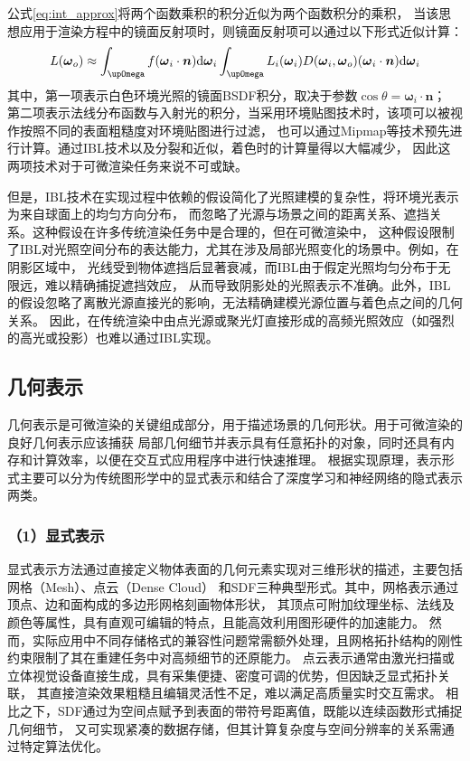 公式\eqref{eq:int_approx}将两个函数乘积的积分近似为两个函数积分的乘积，
当该思想应用于渲染方程中的镜面反射项时，则镜面反射项可以通过以下形式近似计算：
\begin{equation}
  L({\boldsymbol{\omega}}_o)\approx 
  \int_{\upOmega}{f({\boldsymbol{\omega}}_i\cdot{\boldsymbol{n}}){\rm{d}}{\boldsymbol{\omega}}_i}
  \int_{\upOmega}{L_i({\boldsymbol{\omega}}_i)D({\boldsymbol{\omega}}_i,{\boldsymbol{\omega}}_o)({\boldsymbol{\omega}}_i\cdot{\boldsymbol{n}}){\rm{d}}{\boldsymbol{\omega}}_i}
  \label{eq:L_omega_o_approx}
\end{equation}
其中，第一项表示白色环境光照的镜面BSDF积分，取决于参数$\cos{\theta}={\boldsymbol{\omega}}_i\cdot{\boldsymbol{n}}；$
第二项表示法线分布函数与入射光的积分，当采用环境贴图技术时，该项可以被视作按照不同的表面粗糙度对环境贴图进行过滤，
也可以通过Mipmap等技术预先进行计算。通过IBL技术以及分裂和近似，着色时的计算量得以大幅减少，
因此这两项技术对于可微渲染任务来说不可或缺。

但是，IBL技术在实现过程中依赖的假设简化了光照建模的复杂性，将环境光表示为来自球面上的均匀方向分布，
而忽略了光源与场景之间的距离关系、遮挡关系。这种假设在许多传统渲染任务中是合理的，但在可微渲染中，
这种假设限制了IBL对光照空间分布的表达能力，尤其在涉及局部光照变化的场景中。例如，在阴影区域中，
光线受到物体遮挡后显著衰减，而IBL由于假定光照均匀分布于无限远，难以精确捕捉遮挡效应，
从而导致阴影处的光照表示不准确。此外，IBL的假设忽略了离散光源直接光的影响，无法精确建模光源位置与着色点之间的几何关系。
因此，在传统渲染中由点光源或聚光灯直接形成的高频光照效应（如强烈的高光或投影）也难以通过IBL实现。

\subsection{几何表示} \label{sec:geo_representation}
几何表示是可微渲染的关键组成部分，用于描述场景的几何形状。用于可微渲染的良好几何表示应该捕获
局部几何细节并表示具有任意拓扑的对象，同时还具有内存和计算效率，以便在交互式应用程序中进行快速推理。
根据实现原理，表示形式主要可以分为传统图形学中的显式表示和结合了深度学习和神经网络的隐式表示两类。

\subsubsection*{（1）显式表示} 

显式表示方法通过直接定义物体表面的几何元素实现对三维形状的描述，主要包括网格（Mesh）、点云（Dense Cloud）
和SDF三种典型形式。其中，网格表示通过顶点、边和面构成的多边形网格刻画物体形状，
其顶点可附加纹理坐标、法线及颜色等属性，具有直观可编辑的特点，且能高效利用图形硬件的加速能力。
然而，实际应用中不同存储格式的兼容性问题常需额外处理，且网格拓扑结构的刚性约束限制了其在重建任务中对高频细节的还原能力。
点云表示通常由激光扫描或立体视觉设备直接生成，具有采集便捷、密度可调的优势，但因缺乏显式拓扑关联，
其直接渲染效果粗糙且编辑灵活性不足，难以满足高质量实时交互需求。
相比之下，SDF通过为空间点赋予到表面的带符号距离值，既能以连续函数形式捕捉几何细节，
又可实现紧凑的数据存储，但其计算复杂度与空间分辨率的关系需通过特定算法优化。

